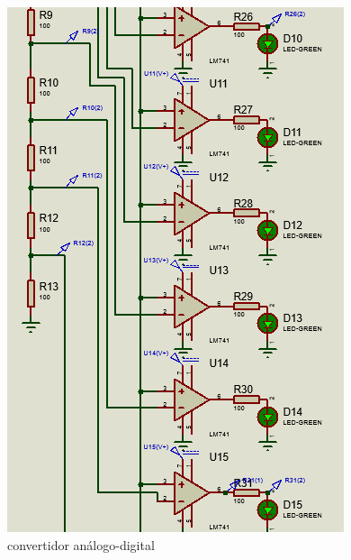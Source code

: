 \documentclass[11pt,a4paper]{article}
\begin{document}
\begin{figure}[ht]
\begin{center}
\includegraphics[scale=0.5]{9.PNG}
\caption{convertidor análogo-digital}
\end{center}
\end{figure}
\end{document}
